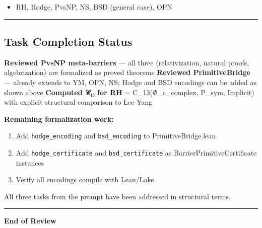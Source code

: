 \documentclass[12pt,a4paper]{article}
\begin{document}
\begin{itemize}
    \item RH, Hodge, PvsNP, NS, BSD (general case), OPN
\end{itemize}

\begin{center}
\rule{0.5\textwidth}{0.4pt}
\end{center}

\subsection{Task Completion Status}

 \textbf{Reviewed PvsNP meta-barriers} --- all three (relativization, natural proofs, algebrization) are formalized as proved theorems
 \textbf{Reviewed PrimitiveBridge} --- already extends to YM, OPN, NS; Hodge and BSD encodings can be added as shown above
 \textbf{Computed 𝒞₁₃ for RH} = C\_13($\Phi$\_c\_complex, P\_sym, Implicit) with explicit structural comparison to Lee-Yang

\textbf{Remaining formalization work:}

\begin{enumerate}
    \item Add \texttt{hodge\_encoding} and \texttt{bsd\_encoding} to PrimitiveBridge.lean
    \item Add \texttt{hodge\_certificate} and \texttt{bsd\_certificate} as BarrierPrimitiveCertificate instances
    \item Verify all encodings compile with Lean/Lake
\end{enumerate}

All three tasks from the prompt have been addressed in structural terms.

\begin{center}
\rule{0.5\textwidth}{0.4pt}
\end{center}

\textbf{End of Review}
\end{document}
